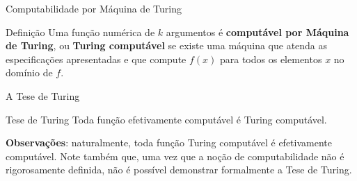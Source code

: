 \begin{frame}[fragile]{Computabilidade por Máquina de Turing}

    \begin{block}{Definição}
        Uma função numérica de $k$ argumentos é \textbf{computável por Máquina de Turing}, ou
        \textbf{Turing computável} se existe uma máquina que atenda as especificações 
        apresentadas e que compute $f(x)$ para todos os elementos $x$ no domínio de $f$.
    \end{block}

\end{frame}

\begin{frame}[fragile]{A Tese de Turing}

    \begin{block}{Tese de Turing}
        Toda função efetivamente computável é Turing computável.
    \end{block}

    \vspace{0.2in}

    \textbf{Observações}: naturalmente, toda função Turing computável é efetivamente computável.
    Note também que, uma vez que a noção de computabilidade não é rigorosamente definida, não é
    possível demonstrar formalmente a Tese de Turing.
\end{frame}

